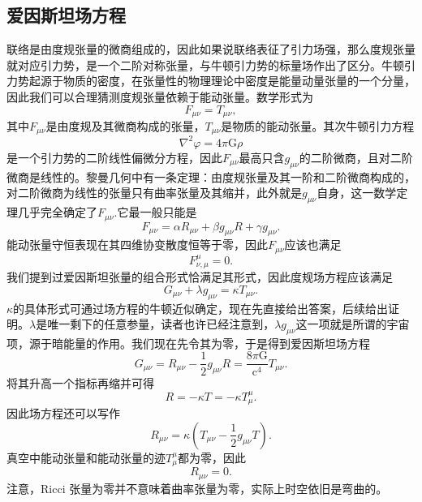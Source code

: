 \documentclass[11pt, a4paper, oneside, onecolumn]{ctexart}
\numberwithin{equation}{subsection}
\begin{document}
\subsection{爱因斯坦场方程}
联络是由度规张量的微商组成的，因此如果说联络表征了引力场强，那么度规张量就对应引力势，是一个二阶对称张量，与牛顿引力势的标量场作出了区分。牛顿引力势起源于物质的密度，在张量性的物理理论中密度是能量动量张量的一个分量，因此我们可以合理猜测度规张量依赖于能动张量。数学形式为
\begin{equation}
F_{\mu\nu}=T_{\mu\nu},
\end{equation}
其中$F_{\mu\nu}$是由度规及其微商构成的张量，$T_{\mu\nu}$是物质的能动张量。其次牛顿引力方程
\begin{equation}
\nabla^{2}\varphi=4\pi\mathrm{G}\rho
\end{equation}
是一个引力势的二阶线性偏微分方程，因此$F_{\mu\nu}$最高只含$g_{\mu\nu}$的二阶微商，且对二阶微商是线性的。黎曼几何中有一条定理：由度规张量及其一阶和二阶微商构成的，对二阶微商为线性的张量只有曲率张量及其缩并，此外就是$g_{\mu\nu}$自身，这一数学定理几乎完全确定了$F_{\mu\nu}$.它最一般只能是
\begin{equation}
F_{\mu\nu}=\alpha R_{\mu\nu}+\beta g_{\mu\nu}R+\gamma g_{\mu\nu}.
\end{equation}
能动张量守恒表现在其四维协变散度恒等于零，因此$F_{\mu\nu}$应该也满足
\begin{equation}
F^{\mu}_{\nu,\mu}=0.
\end{equation}
我们提到过爱因斯坦张量的组合形式恰满足其形式，因此度规场方程应该满足
\begin{equation}
G_{\mu\nu}+\lambda g_{\mu\nu}=\kappa T_{\mu\nu}.
\end{equation}
$\kappa$的具体形式可通过场方程的牛顿近似确定，现在先直接给出答案，后续给出证明。$\lambda$是唯一剩下的任意参量，读者也许已经注意到，$\lambda g_{\mu\nu}$这一项就是所谓的宇宙项，源于暗能量的作用。我们现在先令其为零，于是得到爱因斯坦场方程
\begin{equation}
G_{\mu\nu}=R_{\mu\nu}-\frac12g_{\mu\nu}R=\frac{8\pi\mathrm{G}}{\mathrm{c}^{4}}T_{\mu\nu}.
\end{equation}
将其升高一个指标再缩并可得
\begin{equation}
R=-\kappa T=-\kappa T^{\mu}_{\mu}.
\end{equation}
因此场方程还可以写作
\begin{equation}
R_{\mu\nu}=\kappa\left(T_{\mu\nu}-\frac12g_{\mu\nu}T\right).
\end{equation}
真空中能动张量和能动张量的迹$T^{\mu}_{\mu}$都为零，因此
\begin{equation}
R_{\mu\nu}=0.
\end{equation}
注意，Ricci 张量为零并不意味着曲率张量为零，实际上时空依旧是弯曲的。
\end{document}
